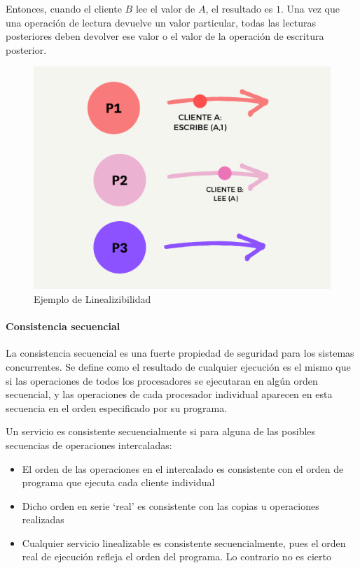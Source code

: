  Entonces, cuando el cliente $B$ lee el valor de $A$, el resultado es $1$. Una vez que una operación de lectura devuelve un valor particular, todas las lecturas posteriores deben devolver ese valor o el valor de la operación de escritura posterior.
 
 
 \begin{figure}   
 	 \begin{center}%
 	\includegraphics[width=0.8\linewidth]{9/1.png } 
 	\caption{Ejemplo de Linealizibilidad}
 	\label{fig:ejm-lin}
 \end{center} 
 \end{figure}
 

 \paragraph{ Consistencia secuencial} 
 
 La consistencia secuencial es una fuerte propiedad de seguridad para los sistemas concurrentes.  Se define \cite{Lamport1979} como el resultado de cualquier ejecución es el mismo que si las operaciones de todos los procesadores se ejecutaran en algún orden secuencial, y las operaciones de cada procesador individual aparecen en esta secuencia en el orden especificado por su programa.
 
 
 Un servicio es consistente secuencialmente si para alguna
 de las posibles secuencias de operaciones intercaladas:
 \begin{itemize}
 	\item El orden de las operaciones en el intercalado es consistente con
 	el orden de programa que ejecuta cada cliente individual
 	 \item Dicho orden en serie ‘real’ es consistente con las copias u
 	operaciones realizadas
 	 \item Cualquier servicio linealizable es consistente
 	secuencialmente, pues el orden real de ejecución refleja el
 	orden del programa.  Lo contrario no es cierto 
 \end{itemize}
 
